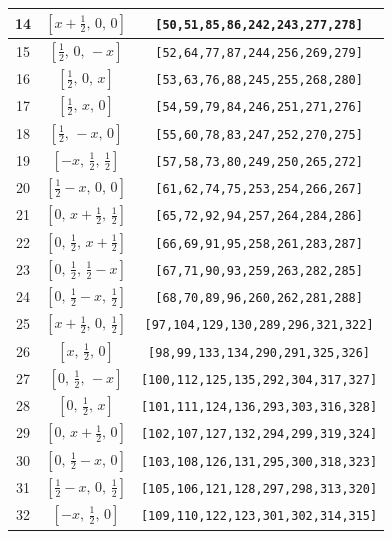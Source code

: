 \documentclass[fleqn,8pt]{jsarticle}
\begin{document}
\begin{longtable}{ccc}
14 & $\left[ x + \frac{1}{2},\, 0,\, 0 \right]$ & {\tt [50,51,85,86,242,243,277,278]} \\ \hline
15 & $\left[ \frac{1}{2},\, 0,\, - x \right]$ & {\tt [52,64,77,87,244,256,269,279]} \\ \hline
16 & $\left[ \frac{1}{2},\, 0,\, x \right]$ & {\tt [53,63,76,88,245,255,268,280]} \\ \hline
17 & $\left[ \frac{1}{2},\, x,\, 0 \right]$ & {\tt [54,59,79,84,246,251,271,276]} \\ \hline
18 & $\left[ \frac{1}{2},\, - x,\, 0 \right]$ & {\tt [55,60,78,83,247,252,270,275]} \\ \hline
19 & $\left[ - x,\, \frac{1}{2},\, \frac{1}{2} \right]$ & {\tt [57,58,73,80,249,250,265,272]} \\ \hline
20 & $\left[ \frac{1}{2} - x,\, 0,\, 0 \right]$ & {\tt [61,62,74,75,253,254,266,267]} \\ \hline
21 & $\left[ 0,\, x + \frac{1}{2},\, \frac{1}{2} \right]$ & {\tt [65,72,92,94,257,264,284,286]} \\ \hline
22 & $\left[ 0,\, \frac{1}{2},\, x + \frac{1}{2} \right]$ & {\tt [66,69,91,95,258,261,283,287]} \\ \hline
23 & $\left[ 0,\, \frac{1}{2},\, \frac{1}{2} - x \right]$ & {\tt [67,71,90,93,259,263,282,285]} \\ \hline
24 & $\left[ 0,\, \frac{1}{2} - x,\, \frac{1}{2} \right]$ & {\tt [68,70,89,96,260,262,281,288]} \\ \hline
25 & $\left[ x + \frac{1}{2},\, 0,\, \frac{1}{2} \right]$ & {\tt [97,104,129,130,289,296,321,322]} \\ \hline
26 & $\left[ x,\, \frac{1}{2},\, 0 \right]$ & {\tt [98,99,133,134,290,291,325,326]} \\ \hline
27 & $\left[ 0,\, \frac{1}{2},\, - x \right]$ & {\tt [100,112,125,135,292,304,317,327]} \\ \hline
28 & $\left[ 0,\, \frac{1}{2},\, x \right]$ & {\tt [101,111,124,136,293,303,316,328]} \\ \hline
29 & $\left[ 0,\, x + \frac{1}{2},\, 0 \right]$ & {\tt [102,107,127,132,294,299,319,324]} \\ \hline
30 & $\left[ 0,\, \frac{1}{2} - x,\, 0 \right]$ & {\tt [103,108,126,131,295,300,318,323]} \\ \hline
31 & $\left[ \frac{1}{2} - x,\, 0,\, \frac{1}{2} \right]$ & {\tt [105,106,121,128,297,298,313,320]} \\ \hline
32 & $\left[ - x,\, \frac{1}{2},\, 0 \right]$ & {\tt [109,110,122,123,301,302,314,315]} \\ \hline

\end{longtable}
\end{document}
